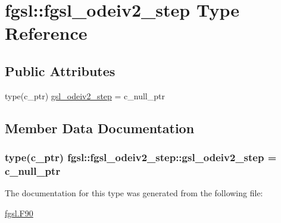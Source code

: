 \hypertarget{structfgsl_1_1fgsl__odeiv2__step}{}\section{fgsl\+:\+:fgsl\+\_\+odeiv2\+\_\+step Type Reference}
\label{structfgsl_1_1fgsl__odeiv2__step}
\subsection*{Public Attributes}
\begin{DoxyCompactItemize}
\item 
type(c\+\_\+ptr) \hyperlink{structfgsl_1_1fgsl__odeiv2__step_aeface4aae3056c0c9200d1d1573febd9}{gsl\+\_\+odeiv2\+\_\+step} = c\+\_\+null\+\_\+ptr
\end{DoxyCompactItemize}


\subsection{Member Data Documentation}
\hypertarget{structfgsl_1_1fgsl__odeiv2__step_aeface4aae3056c0c9200d1d1573febd9}{}
\subsubsection[{gsl\+\_\+odeiv2\+\_\+step}]{\setlength{\rightskip}{0pt plus 5cm}type(c\+\_\+ptr) fgsl\+::fgsl\+\_\+odeiv2\+\_\+step\+::gsl\+\_\+odeiv2\+\_\+step = c\+\_\+null\+\_\+ptr}\label{structfgsl_1_1fgsl__odeiv2__step_aeface4aae3056c0c9200d1d1573febd9}


The documentation for this type was generated from the following file\+:\begin{DoxyCompactItemize}
\item 
\hyperlink{fgsl_8F90}{fgsl.\+F90}\end{DoxyCompactItemize}
